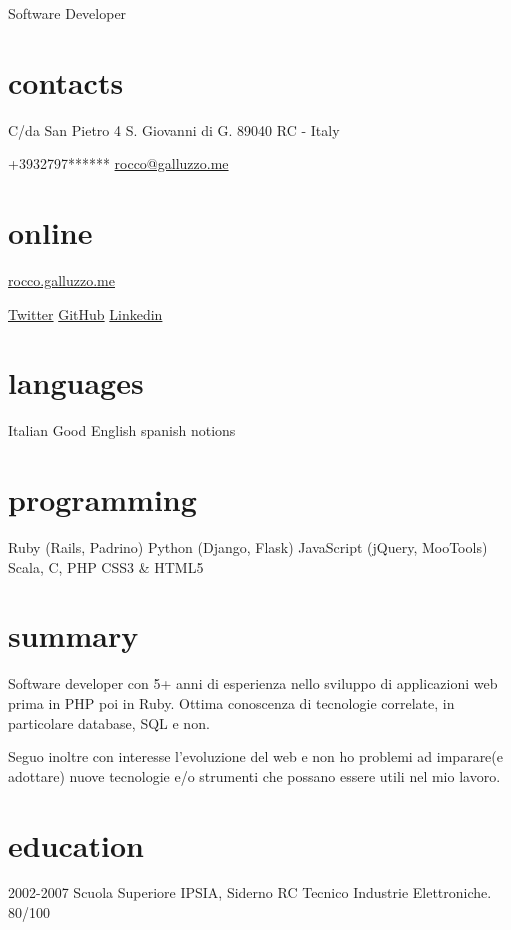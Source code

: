 \documentclass[print]{cv}
\begin{document}
       {Software Developer}

\begin{aside}%
\section{contacts}
    C/da San Pietro 4
    S. Giovanni di G.
89040 RC - Italy\par\smallskip%
+3932797******
  \href{mailto:rocco@galluzzo.me}{rocco@galluzzo.me}
  \section{online}
  \href{http://rocco.galluzzo.me}{rocco.galluzzo.me}
         \par\smallskip%
  \href{http://twitter.com/byterussian}{Twitter}
           \href{https://github.com/byterussian}{GitHub}
           \href{http://www.linkedin.com/in/roccogalluzzo}{Linkedin}
  \section{languages}
    Italian
    Good English
    spanish notions
  \section{programming}
    Ruby
    (Rails, Padrino)
    Python
    (Django, Flask)
    JavaScript
    (jQuery, MooTools)
    Scala, C, PHP
    CSS3 \& HTML5
\end{aside}

\section{summary}
Software developer con 5+ anni di esperienza nello sviluppo di applicazioni web
prima in PHP poi in Ruby. Ottima conoscenza di tecnologie correlate, in particolare
database, SQL e non.

Seguo inoltre con interesse l'evoluzione del web e non ho problemi ad imparare(e adottare)
nuove tecnologie e/o strumenti che possano essere utili nel mio lavoro.
\section{education}

\begin{entrylist}

  \entry
    {2002-2007}
    {Scuola Superiore}
    {IPSIA, Siderno RC}
    {Tecnico Industrie Elettroniche. 80/100}

\end{entrylist}
\end{document}
